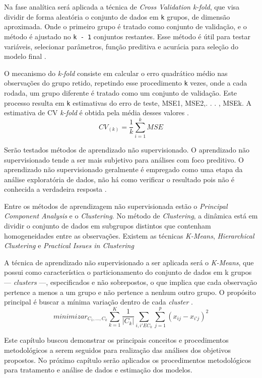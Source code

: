 \documentclass[12pt,12pt,openright,oneside,a4paper,chapter=TITLE,section=TITLE,subsection=TITLE,subsubsection=TITLE,english,french,spanish,portugues,sumario=tradicional]{abntex2}
\begin{document}
Na fase analítica será aplicada a técnica de \emph{Cross Validation k-fold}, que visa dividir de forma aleatória o conjunto de dados em \texttt{k} grupos, de dimensão aproximada. Onde o primeiro grupo é tratado como conjunto de validação, e o método é ajustado no \texttt{k\ -\ 1} conjuntos restantes. Esse método é útil para testar variáveis, selecionar parâmetros, função preditiva e acurácia para seleção do modelo final \cite{gareth:2017}.

O mecanismo do \emph{k-fold} consiste em calcular o erro quadrático médio nas observações do grupo retido, repetindo esse procedimento \texttt{k} vezes, onde a cada rodada, um grupo diferente é tratado como um conjunto de validação. Este processo resulta em \texttt{k} estimativas do erro de teste, MSE1, MSE2,. . . , MSEk. A estimativa de CV \emph{k-fold} é obtida pela média desses valores \cite{gareth:2017}.
\[
CV_{(k)} = \frac{1}{k}\sum_{i=1}^{k}MSE  
\]

Serão testados métodos de aprendizado não supervisionado. O aprendizado não supervisionado tende a ser mais subjetivo para análises com foco preditivo. O aprendizado não supervisionado geralmente é empregado como uma etapa da análise exploratória de dados, não há como verificar o resultado pois não é conhecida a verdadeira resposta \cite{gareth:2017}.

Entre os métodos de aprendizagem não supervisionada estão o \emph{Principal Component Analysis} e o \emph{Clustering}. No método de \emph{Clustering}, a dinâmica está em dividir o conjunto de dados em subgrupos distintos que contenham homogeneidades entre as observações. Existem as técnicas \emph{K-Means}, \emph{Hierarchical Clustering} e \emph{Practical Issues in Clustering} \cite{gareth:2017}

A técnica de aprendizado não supervisionado a ser aplicada será o \emph{K-Means}, que possui como característica o particionamento do conjunto de dados em k grupos --- \emph{clusters} ---, especificados e não sobrepostos, o que implica que cada observação pertence a menos a um grupo e não pertence a nenhum outro grupo. O propósito principal é buscar a mínima variação dentro de cada \emph{cluster} \cite{gareth:2017}.
\[
minimizar_{C_1,...,C_k} \sum_{k = 1}^{K}\frac{1}{|C_k|}\sum_{i,i' E C_k} \sum_{j=1}^{p}(x_{ij} - x_{i'j})^2 
\]

Este capítulo buscou demonstrar os principais conceitos e procedimentos metodológicos a serem seguidos para realização das análises dos objetivos propostos. No próximo capítulo serão aplicados os procedimentos metodológicos para tratamento e análise de dados e estimação dos modelos.
\end{document}

